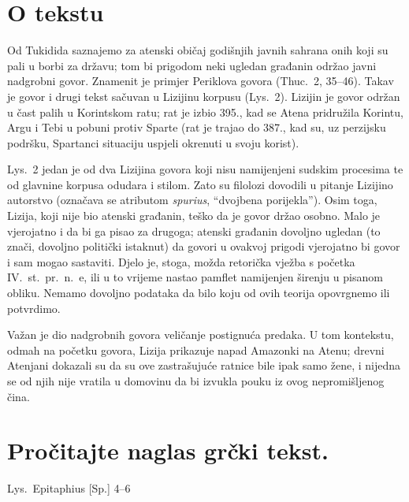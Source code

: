 

\section*{O tekstu}

Od Tukidida saznajemo za atenski običaj godišnjih javnih sahrana onih koji su pali u borbi za državu; tom bi prigodom neki ugledan građanin održao javni nadgrobni govor. Znamenit je primjer Periklova govora (Thuc.~2, 35–46). Takav je govor i drugi tekst sačuvan u Lizijinu korpusu (Lys.~2). Lizijin je govor održan u čast palih u Korintskom ratu; rat je izbio 395., kad se Atena pridružila Korintu, Argu i Tebi u pobuni protiv Sparte (rat je trajao do 387., kad su, uz perzijsku podršku, Spartanci situaciju uspjeli okrenuti u svoju korist).

Lys.~2 jedan je od dva Lizijina govora koji nisu namijenjeni sudskim procesima te od glavnine korpusa odudara i stilom. Zato su filolozi dovodili u pitanje Lizijino autorstvo (označava se atributom \textit{spurius}, ``dvojbena porijekla''). Osim toga, Lizija, koji nije bio atenski građanin, teško da je govor držao osobno. Malo je vjerojatno i da bi ga pisao za drugoga; atenski građanin dovoljno ugledan (to znači, dovoljno politički istaknut) da govori u ovakvoj prigodi vjerojatno bi govor i sam mogao sastaviti. Djelo je, stoga, možda retorička vježba s početka IV.~st.\ pr.~n.~e, ili u to vrijeme nastao pamflet namijenjen širenju u pisanom obliku. Nemamo dovoljno podataka da bilo koju od ovih teorija opovrgnemo ili potvrdimo.

Važan je dio nadgrobnih govora veličanje postignuća predaka. U tom kontekstu, odmah na početku govora, Lizija prikazuje napad Amazonki na Atenu; drevni Atenjani dokazali su da su ove zastrašujuće ratnice bile ipak samo žene, i nijedna se od njih nije vratila u domovinu da bi izvukla pouku iz ovog nepromišljenog čina.


\newpage

\section*{Pročitajte naglas grčki tekst.}

Lys.\ Epitaphius [Sp.] 4–6


